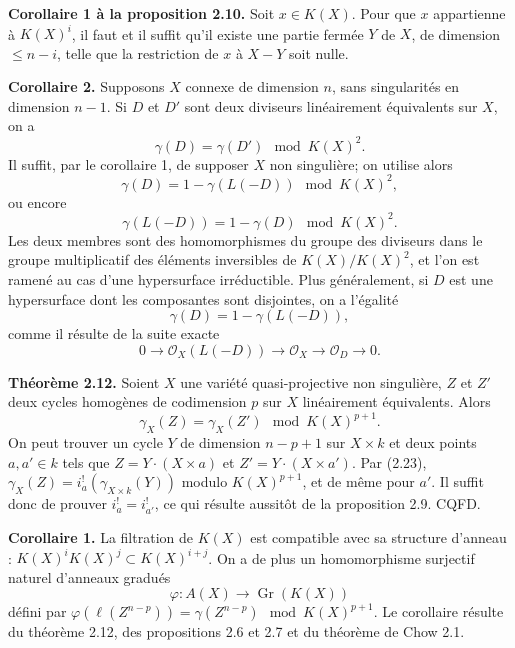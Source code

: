 \documentclass[11pt]{article}
\newcommand{\Gr}{\operatorname{Gr}}
\providecommand{\Gr}{\operatorname{Gr}}
\providecommand{\ellc}{\ell}
\providecommand{\Gr}{\operatorname{G}}
\providecommand{\cO}{\mathcal O}
\begin{document}
\textbf{Corollaire 1 à la proposition 2.10.} Soit $x\in K(X)$. Pour que $x$ appartienne à $K(X)^i$, il faut et il suffit qu'il existe une partie fermée $Y$ de $X$, de dimension $\leq n-i$, telle que la restriction de $x$ à $X-Y$ soit nulle.

\textbf{Corollaire 2.} Supposons $X$ connexe de dimension $n$, sans singularités en dimension $n-1$. Si $D$ et $D'$ sont deux diviseurs linéairement équivalents sur $X$, on a
\[
 \gamma(D)=\gamma(D')\mod K(X)^2.
\]
Il suffit, par le corollaire 1, de supposer $X$ non singulière; on utilise alors
\begin{equation}\tag{2.31}
 \gamma(D)=1-\gamma(L(-D))\mod K(X)^2,
\end{equation}
ou encore
\begin{equation}\tag{2.31 bis}
 \gamma(L(-D))=1-\gamma(D)\mod K(X)^2.
\end{equation}
Les deux membres sont des homomorphismes du groupe des diviseurs dans le groupe multiplicatif des éléments inversibles de $K(X)/K(X)^2$, et l'on est ramené au cas d'une hypersurface irréductible. Plus généralement, si $D$ est une hypersurface dont les composantes sont disjointes, on a l'égalité
\begin{equation}\tag{2.32}
 \gamma(D)=1-\gamma(L(-D)),
\end{equation}
comme il résulte de la suite exacte
\[
0\to\cO_X(L(-D))\to\cO_X\to\cO_D\to0.
\]

\textbf{Théorème 2.12.} Soient $X$ une variété quasi-projective non singulière, $Z$ et $Z'$ deux cycles homogènes de codimension $p$ sur $X$ linéairement équivalents. Alors
\begin{equation}\tag{2.33}
 \gamma_X(Z)=\gamma_X(Z')\mod K(X)^{p+1}.
\end{equation}
On peut trouver un cycle $Y$ de dimension $n-p+1$ sur $X\times k$ et deux points $a,a'\in k$ tels que $Z=Y\cdot(X\times a)$ et $Z'=Y\cdot(X\times a')$. Par (2.23), $\gamma_X(Z)=i_a^!(\gamma_{X\times k}(Y))$ modulo $K(X)^{p+1}$, et de même pour $a'$. Il suffit donc de prouver $i_a^!=i_{a'}^!$, ce qui résulte aussitôt de la proposition 2.9. CQFD.

\textbf{Corollaire 1.} La filtration de $K(X)$ est compatible avec sa structure d'anneau : $K(X)^iK(X)^j\subset K(X)^{i+j}$. On a de plus un homomorphisme surjectif naturel d'anneaux gradués
\begin{equation}\tag{2.34}
 \varphi:A(X)\longrightarrow\Gr(K(X))
\end{equation}
défini par $\varphi(\ellc(Z^{n-p}))=\gamma(Z^{n-p})\mod K(X)^{p+1}$. Le corollaire résulte du théorème 2.12, des propositions 2.6 et 2.7 et du théorème de Chow 2.1.
\end{document}
